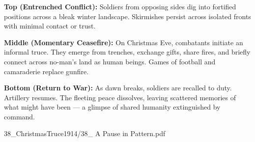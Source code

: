 \begin{SideNotePage}{
  \textbf{Top (Entrenched Conflict):} Soldiers from opposing sides dig into fortified positions across a bleak winter landscape. Skirmishes persist across isolated fronts with minimal contact or trust. \par

  \textbf{Middle (Momentary Ceasefire):} On Christmas Eve, combatants initiate an informal truce. They emerge from trenches, exchange gifts, share fires, and briefly connect across no-man’s land as human beings. Games of football and camaraderie replace gunfire. \par

  \textbf{Bottom (Return to War):} As dawn breaks, soldiers are recalled to duty. Artillery resumes. The fleeting peace dissolves, leaving scattered memories of what might have been — a glimpse of shared humanity extinguished by command. \par
}{38_ChristmasTruce1914/38_ A Pause in Pattern.pdf}
\end{SideNotePage}

